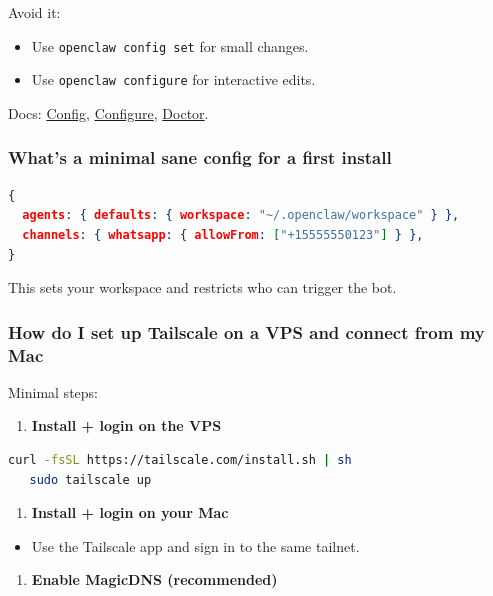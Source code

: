 Avoid it:

\begin{itemize}
  \item Use \texttt{openclaw config set} for small changes.
  \item Use \texttt{openclaw configure} for interactive edits.
\end{itemize}


Docs: \href{/cli/config}{Config}, \href{/cli/configure}{Configure}, \href{/gateway/doctor}{Doctor}.

\subsubsection{What's a minimal sane config for a first install}


\begin{lstlisting}[language=json]
{
  agents: { defaults: { workspace: "~/.openclaw/workspace" } },
  channels: { whatsapp: { allowFrom: ["+15555550123"] } },
}
\end{lstlisting}


This sets your workspace and restricts who can trigger the bot.

\subsubsection{How do I set up Tailscale on a VPS and connect from my Mac}


Minimal steps:

\begin{enumerate}
  \item \textbf{Install + login on the VPS}
\end{enumerate}


\begin{lstlisting}[language=bash]
   curl -fsSL https://tailscale.com/install.sh | sh
   sudo tailscale up
\end{lstlisting}


\begin{enumerate}
  \item \textbf{Install + login on your Mac}
\end{enumerate}

\begin{itemize}
  \item Use the Tailscale app and sign in to the same tailnet.
\end{itemize}

\begin{enumerate}
  \item \textbf{Enable MagicDNS (recommended)}
\end{enumerate}

